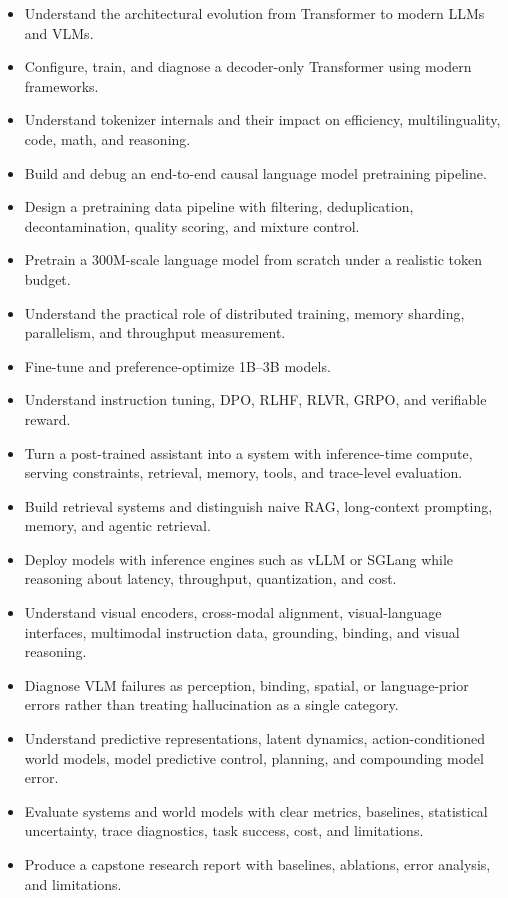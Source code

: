 \begin{itemize}
    \item Understand the architectural evolution from Transformer to modern LLMs and VLMs.
    \item Configure, train, and diagnose a decoder-only Transformer using modern frameworks.
    \item Understand tokenizer internals and their impact on efficiency, multilinguality, code, math, and reasoning.
    \item Build and debug an end-to-end causal language model pretraining pipeline.
    \item Design a pretraining data pipeline with filtering, deduplication, decontamination, quality scoring, and mixture control.
    \item Pretrain a 300M-scale language model from scratch under a realistic token budget.
    \item Understand the practical role of distributed training, memory sharding, parallelism, and throughput measurement.
    \item Fine-tune and preference-optimize 1B--3B models.
    \item Understand instruction tuning, DPO, RLHF, RLVR, GRPO, and verifiable reward.
    \item Turn a post-trained assistant into a system with inference-time compute, serving constraints, retrieval, memory, tools, and trace-level evaluation.
    \item Build retrieval systems and distinguish naive RAG, long-context prompting, memory, and agentic retrieval.
    \item Deploy models with inference engines such as vLLM or SGLang while reasoning about latency, throughput, quantization, and cost.
    \item Understand visual encoders, cross-modal alignment, visual-language interfaces, multimodal instruction data, grounding, binding, and visual reasoning.
    \item Diagnose VLM failures as perception, binding, spatial, or language-prior errors rather than treating hallucination as a single category.
    \item Understand predictive representations, latent dynamics, action-conditioned world models, model predictive control, planning, and compounding model error.
    \item Evaluate systems and world models with clear metrics, baselines, statistical uncertainty, trace diagnostics, task success, cost, and limitations.
    \item Produce a capstone research report with baselines, ablations, error analysis, and limitations.
\end{itemize}

